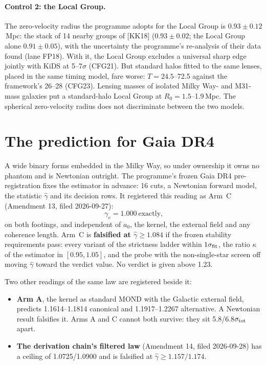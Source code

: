 \documentclass[10pt]{article}
\begin{document}
\paragraph{Control 2: the Local Group.} The zero-velocity radius the programme adopts for the Local Group is $0.93\pm0.12$\,Mpc: the stack of 14 nearby groups of [KK18] ($0.93\pm0.02$; the Local Group alone $0.91\pm0.05$), with the uncertainty the programme's re-analysis of their data found (lane FP18). With it, the Local Group excludes a universal sharp edge jointly with KiDS at 5--7$\sigma$ (CFG21). But standard halos fitted to the same lenses, placed in the same timing model, fare worse: $T=24.5$--72.5 against the framework's 26--28 (CFG23). Lensing masses of isolated Milky Way- and M31-mass galaxies put a standard-halo Local Group at $R_0=1.5$--1.9\,Mpc. The spherical zero-velocity radius does not discriminate between the two models.

\section{The prediction for Gaia DR4}\label{sec:dr4}

A wide binary forms embedded in the Milky Way, so under ownership it owns no phantom and is Newtonian outright. The programme's frozen Gaia DR4 pre-registration fixes the estimator in advance: 16 cuts, a Newtonian forward model, the statistic $\hat\gamma$ and its decision rows. It registered this reading as Arm~C (Amendment 13, filed 2026-09-27):
\begin{equation}
\gamma_v=1.000\ \text{exactly,}
\end{equation}
on both footings, and independent of $a_0$, the kernel, the external field and any coherence length. Arm~C is \textbf{falsified at $\hat\gamma\geq1.084$} if the frozen stability requirements pass: every variant of the strictness ladder within $1\sigma_{\rm fit}$, the ratio $\kappa$ of the estimator in $[0.95,1.05]$, and the probe with the non-single-star screen off moving $\hat\gamma$ toward the verdict value. No verdict is given above 1.23.

Two other readings of the same law are registered beside it:
\begin{itemize}
\item \textbf{Arm A}, the kernel as standard MOND with the Galactic external field, predicts 1.1614--1.1814 canonical and 1.1917--1.2267 alternative. A Newtonian result falsifies it. Arms A and C cannot both survive: they sit 5.8/6.8$\sigma_{\rm tot}$ apart.
\item \textbf{The derivation chain's filtered law} (Amendment 14, filed 2026-09-28) has a ceiling of 1.0725/1.0900 and is falsified at $\hat\gamma\geq1.157/1.174$.
\end{itemize}
\end{document}

